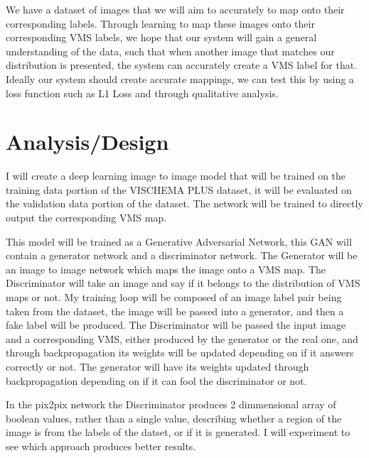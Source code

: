 \documentclass{UoYCSproject}
\begin{document}
We have a dataset of images that we will aim to accurately to map onto their corresponding labels. Through learning to map these images onto their corresponding VMS labels, we hope that our system will gain a general understanding of the data, such that when another image that matches our distribution is presented, the system can accurately create a VMS label for that. Ideally our system should create accurate mappings, we can test this by using a loss function such as L1 Loss and through qualitative analysis. 

\section{Analysis/Design}


I will create a deep learning image to image model that will be trained on the training data portion of the VISCHEMA PLUS dataset, it will be evaluated on the validation data portion of the dataset. The network will be trained to directly output the corresponding VMS map.

This model will be trained as a Generative Adversarial Network, this GAN will contain a generator network and a discriminator network. The Generator will be an image to image network which maps the image onto a VMS map. The Discriminator will take an image and say if it belongs to the distribution of VMS maps or not. My training loop will be composed of an image label pair being taken from the dataset, the image will be passed into a generator, and then a fake label will be produced. The Discriminator will be passed the input image and a corresponding VMS, either produced by the generator or the real one, and through backpropagation its weights will be updated depending on if it answers correctly or not. The generator will have its weights updated through backpropagation depending on if it can fool the discriminator or not. 

In the pix2pix network the Discriminator produces 2 dimmensional array of boolean values, rather than a single value, describing whether a region of the image is from the labels of the datset, or if it is generated. I will experiment to see which approach produces better results. 

\end{document}
